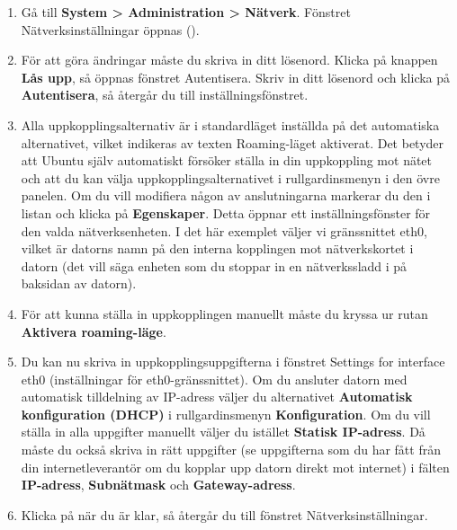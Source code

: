 \documentclass[a4paper,final]{memoir} %
\begin{document}
\begin{enumerate}

\item Gå till \textbf{System \textgreater{} Administration \textgreater{} Nätverk}. Fönstret Nätverksinställningar öppnas (). 

\item För att göra ändringar måste du skriva in ditt lösenord. Klicka på knappen \textbf{Lås upp}, så öppnas fönstret Autentisera. Skriv in ditt lösenord och klicka på \textbf{Autentisera}, så återgår du till inställningsfönstret.

 

\item Alla uppkopplingsalternativ är i standardläget inställda på det automatiska alternativet, vilket indikeras av texten Roaming-läget aktiverat. Det betyder att Ubuntu själv automatiskt försöker ställa in din uppkoppling mot nätet och att du kan välja uppkopplingsalternativet i rullgardinsmenyn i den övre panelen. Om du vill modifiera någon av anslutningarna markerar du den i listan och klicka på \textbf{Egenskaper}. Detta öppnar ett inställningsfönster för den valda nätverksenheten. I det här exemplet väljer vi gränssnittet eth0, vilket är datorns namn på den interna kopplingen mot nätverkskortet i datorn (det vill säga enheten som du stoppar in en nätverkssladd i på baksidan av datorn). 

\item För att kunna ställa in uppkopplingen manuellt måste du kryssa ur rutan \textbf{Aktivera roaming-läge}. 

\item Du kan nu skriva in uppkopplingsuppgifterna i fönstret Settings for interface eth0 (inställningar för eth0-gränssnittet). Om du ansluter datorn med automatisk tilldelning av IP-adress väljer du alternativet \textbf{Automatisk konfiguration (DHCP)} i rullgardinsmenyn \textbf{Konfiguration}. Om du vill ställa in alla uppgifter manuellt väljer du istället \textbf{Statisk IP-adress}. Då måste du också skriva in rätt uppgifter (se uppgifterna som du har fått från din internetleverantör om du kopplar upp datorn direkt mot internet) i fälten \textbf{IP-adress}, \textbf{Subnätmask} och \textbf{Gateway-adress}. 

\item Klicka på \xok{} när du är klar, så återgår du till fönstret Nätverksinställningar. 


\end{enumerate}
\end{document}
